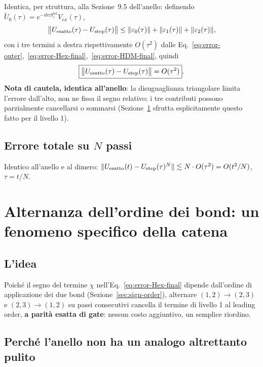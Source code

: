 \documentclass[11pt,a4paper]{article}
\begin{document}
Identica, per struttura, alla Sezione~9.5 dell'anello: definendo $\tilde U_0(\tau)=e^{-ib\tau S_z^{tot}}V_{ex}(\tau)$,
\begin{equation}
\big\|U_{\rm esatto}(\tau)-U_{\rm step}(\tau)\big\| \le \|\varepsilon_0(\tau)\|+\|\varepsilon_1(\tau)\|+\|\varepsilon_2(\tau)\|,
\label{eq:triangle-step}
\end{equation}
con i tre termini a destra rispettivamente $O(\tau^2)$ dalle Eq.~\eqref{eq:error-outer},~\eqref{eq:error-Hex-final},~\eqref{eq:error-HDM-final}, quindi
\begin{equation}
\boxed{\big\|U_{\rm esatto}(\tau)-U_{\rm step}(\tau)\big\| = O(\tau^2)}.
\label{eq:total-error-bound}
\end{equation}
\textbf{Nota di cautela, identica all'anello}: la disuguaglianza triangolare limita l'errore dall'alto, non ne fissa il segno relativo; i tre contributi possono parzialmente cancellarsi o sommarsi (Sezione~\ref{sec:alternanza} sfrutta esplicitamente questo fatto per il livello 1).

\subsection{Errore totale su $N$ passi}

Identico all'anello e al dimero: $\|U_{\rm esatto}(t)-U_{\rm step}(\tau)^N\|\lesssim N\cdot O(\tau^2)=O(t^2/N)$, $\tau=t/N$.

\section{Alternanza dell'ordine dei bond: un fenomeno specifico della catena}
\label{sec:alternanza}

\subsection{L'idea}

Poiché il segno del termine $\chi$ nell'Eq.~\eqref{eq:error-Hex-final} dipende dall'ordine di applicazione dei due bond (Sezione~\ref{sec:sign-order}), alternare $(1,2)\!\to\!(2,3)$ e $(2,3)\!\to\!(1,2)$ su passi consecutivi cancella il termine di livello 1 al leading order, \textbf{a parità esatta di gate}: nessun costo aggiuntivo, un semplice riordino.

\subsection{Perché l'anello non ha un analogo altrettanto pulito}
\end{document}
